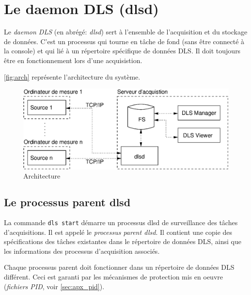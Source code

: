 \documentclass[a4paper,12pt,BCOR6mm,bibtotoc,idxtotoc]{scrbook}
\begin{document}
\chapter{Le daemon DLS (dlsd)} \label{sec:dlsd}

Le \textit{daemon DLS} (en abr\'eg\'e: \textit{dlsd}) sert \`a
l'ensemble de l'acquisition et du stockage de
donn\'ees. C'est un processus qui tourne en t\^ache de
fond (sans \^etre connect\'e \`a la console) et qui li\'e \`a un
r\'epertoire sp\'ecifique de donn\'ees DLS.
Il doit toujours \^etre en fonctionnement lors d'une
acquisistion.

\autoref{fig:arch} repr\'esente l'architecture du syst\`eme.

\begin{figure}[htb]
  \begin{center}
    \includegraphics[width=350pt]{bilder/arch_fr}
  \end{center}
  \caption{Architecture}
  \label{fig:arch}
\end{figure}


\section{Le processus parent dlsd}
\label{sec:dlsd_mother}

La commande \texttt{dls start} d\'emarre un processus dlsd de
surveillance des t\^aches d'acquisitions. Il
est appel\'e le \textit{processus parent dlsd}.  Il contient une copie
des sp\'ecifications des t\^aches existantes dans le r\'epertoire de
donn\'ees DLS, ainsi que les informations des processus d'acquisition
associ\'es.

Chaque processus parent doit fonctionner dans un r\'epertoire de
donn\'ees DLS diff\'erent.  Ceci est garanti
par les m\'ecanismes de protection mis en oeuvre (\textit{fichiers
  PID}, voir \autoref{sec:apx_pid}).
\end{document}
